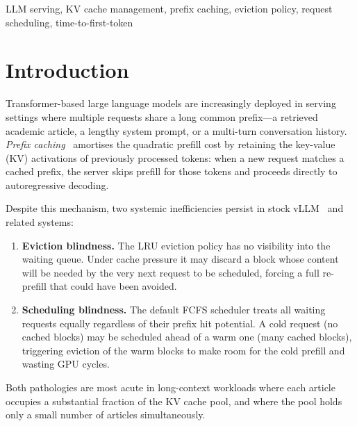 \documentclass[journal]{IEEEtran}
\begin{document}
\begin{IEEEkeywords}
LLM serving, KV cache management, prefix caching, eviction policy,
request scheduling, time-to-first-token
\end{IEEEkeywords}

\section{Introduction}
\label{sec:intro}

Transformer-based large language models are increasingly deployed in serving
settings where multiple requests share a long common prefix—a retrieved
academic article, a lengthy system prompt, or a multi-turn conversation
history. \emph{Prefix caching}~\cite{kwon2023efficient} amortises the
quadratic prefill cost by retaining the key-value (KV) activations of
previously processed tokens: when a new request matches a cached prefix,
the server skips prefill for those tokens and proceeds directly to
autoregressive decoding.

Despite this mechanism, two systemic inefficiencies persist in stock
vLLM~\cite{kwon2023efficient} and related systems:

\begin{enumerate}

\item \textbf{Eviction blindness.} The LRU eviction policy has no visibility
into the waiting queue. Under cache pressure it may discard a block whose
content will be needed by the very next request to be scheduled, forcing
a full re-prefill that could have been avoided.

\item \textbf{Scheduling blindness.} The default FCFS scheduler treats all
waiting requests equally regardless of their prefix hit potential. A cold
request (no cached blocks) may be scheduled ahead of a warm one (many cached
blocks), triggering eviction of the warm blocks to make room for the cold
prefill and wasting GPU cycles.

\end{enumerate}

Both pathologies are most acute in long-context workloads where each article
occupies a substantial fraction of the KV cache pool, and where the pool holds
only a small number of articles simultaneously.
\end{document}
